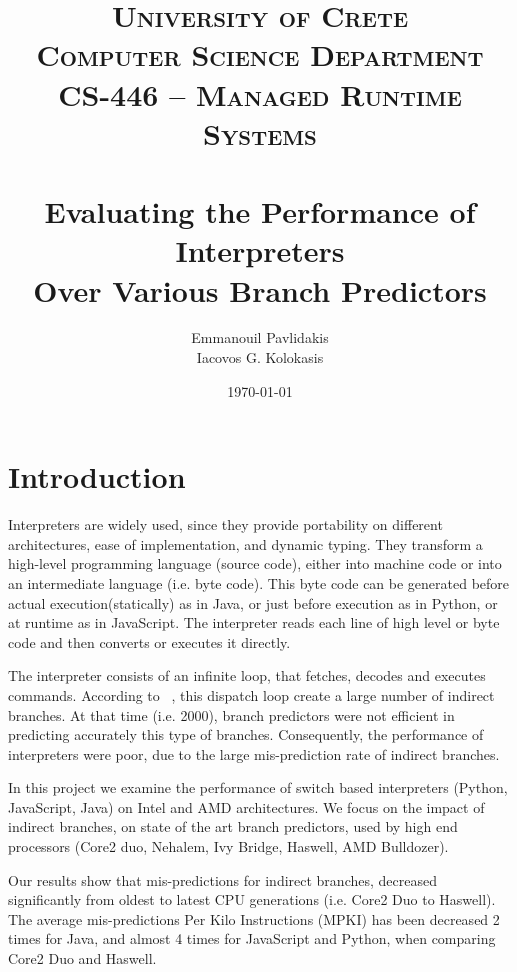 \documentclass[parskip=full, paper=a4, fontsize=12pt]{scrartcl}
\title{%
\normalfont \normalsize 
\textsc{University of Crete\\
Computer Science Department \\
CS-446 -- Managed Runtime Systems} \\ [20pt] 
\horrule{0.5pt} \\[0.4cm]
\huge
Evaluating the Performance of Interpreters\\Over Various Branch Predictors
\horrule{2pt} \\[0.5cm] 
}
\author{%
    Emmanouil Pavlidakis \\
    Iacovos G. Kolokasis%
    }
\date{\normalsize\today}
\numberwithin{equation}{section}
\numberwithin{figure}{section}
\numberwithin{table}{section}
\begin{document}
\maketitle 

\section{Introduction}

Interpreters are widely used, since they provide portability on
different architectures, ease of implementation, and dynamic typing.
They transform a high-level programming language (source code), either
into machine code or into an intermediate language (i.e. byte code).
This byte code can be generated before actual execution(statically) as
in Java, or just before execution as in Python, or at runtime as in
JavaScript. The interpreter reads each line of high level or byte code
and then converts or executes it directly. 

The interpreter consists of an infinite loop, that fetches, decodes
and executes commands.  According to ~\cite{ertl2003structure}, this
dispatch loop create a large number of indirect branches. At that time
(i.e. 2000), branch predictors were not efficient in predicting
accurately this type of branches. Consequently, the performance of
interpreters were poor, due to the large mis-prediction rate of
indirect branches.  

In this project we examine the performance of switch based
interpreters (Python, JavaScript, Java) on Intel and AMD
architectures. We focus on the impact of indirect branches, on state
of the art branch predictors, used by high end processors (Core2 duo,
Nehalem, Ivy Bridge, Haswell, AMD Bulldozer).

Our results show that mis-predictions for indirect branches, decreased
significantly from oldest to latest CPU generations (i.e. Core2 Duo to
Haswell). The average mis-predictions Per Kilo Instructions (MPKI) has
been decreased 2 times for Java, and almost 4 times for JavaScript and
Python, when comparing Core2 Duo and Haswell.   

\end{document}
